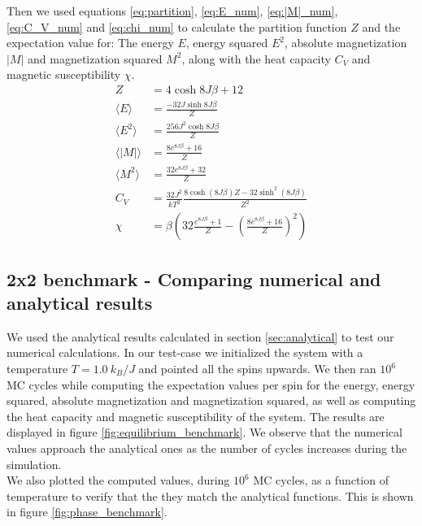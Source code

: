 \documentclass[%
 reprint,
nofootinbib,
aps,
]{revtex4-1}
\begin{document}
Then we used equations \ref{eq:partition}, \ref{eq:E_num}, \ref{eq:|M|_num}, \ref{eq:C_V_num} and \ref{eq:chi_num} to calculate the partition function $Z$ and the expectation value for: The energy $E$, energy squared $E^2$, absolute magnetization $|M|$ and magnetization squared $M^2$, along with the heat capacity $C_V$ and magnetic susceptibility $\chi$.
\begin{align*}
    Z &= 4\cosh{8J\beta} + 12 \\
    \langle E \rangle &= \frac{-32J\sinh{8J\beta}}{Z} \\
    \langle E^2 \rangle &= \frac{256J^2 \cosh{8J\beta}}{Z} \\
    \langle|M|\rangle  &= \frac{8e^{8J\beta} + 16}{Z} \\
    \langle M^2 \rangle &= \frac{32e^{8J\beta} + 32}{Z} \\
    C_V &= \frac{32J^2}{kT^2}\frac{8\cosh{(8J\beta)}Z -32\sinh^2{(8J\beta)}}{Z^2} \\
    \chi &= \beta\left(32\frac{e^{8J\beta} + 1}{Z} - (\frac{8e^{8J\beta} + 16}{Z})^2\right) 
\end{align*}

\subsection{2x2 benchmark - Comparing numerical and analytical results}\label{sec:2x2}
We used the analytical results calculated in section \ref{sec:analytical} to test our numerical calculations. In our test-case we initialized the system with a temperature $T = 1.0 \ k_B/J$ and pointed all the spins upwards. We then ran $10^6$ MC cycles while computing the expectation values per spin for the energy, energy squared, absolute magnetization and magnetization squared, as well as computing the heat capacity and magnetic susceptibility of the system. The results are displayed in figure \ref{fig:equilibrium_benchmark}. We observe that the numerical values approach the analytical ones as the number of cycles increases during the simulation.\\
We also plotted the computed values, during $10^6$ MC cycles, as a function of temperature to verify that the they match the analytical functions. This is shown in figure \ref{fig:phase_benchmark}.

\onecolumngrid
\end{document}
